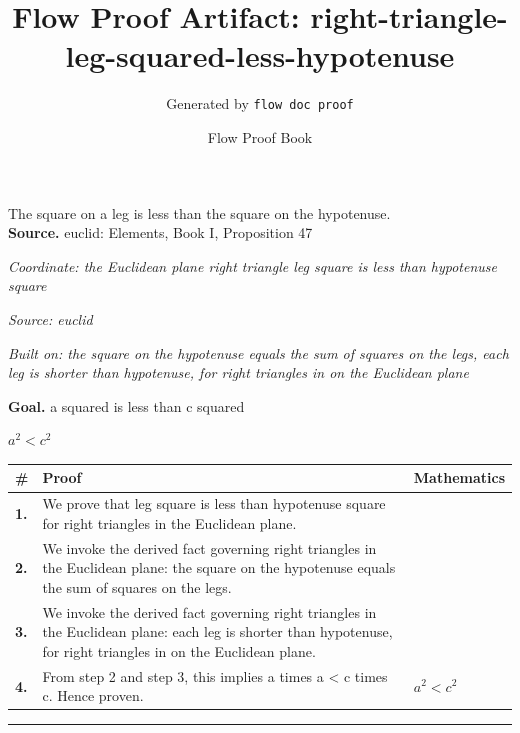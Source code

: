 \documentclass[11pt]{article}
\title{Flow Proof Artifact: right-triangle-leg-squared-less-hypotenuse}
\author{Generated by \texttt{flow doc proof}}
\date{Flow Proof Book}
\theoremstyle{definition}
\begin{document}
\maketitle
The square on a leg is less than the square on the hypotenuse.\\[0.5em]
\textbf{Source.} euclid: Elements, Book I, Proposition 47\\[0.5em]
\bigskip
{}\par
\smallskip\noindent\textit{Coordinate: the Euclidean plane \cdot right triangle \cdot leg square is less than hypotenuse square}\par
\smallskip\noindent\textit{Source: euclid}\par
\smallskip\noindent\textit{Built on: the square on the hypotenuse equals the sum of squares on the legs, each leg is shorter than hypotenuse, for right triangles in on the Euclidean plane}\par
\medskip
\noindent\textbf{Goal.} a squared is less than c squared\par
\noindent$\displaystyle a^{2} < c^{2}$\par
\medskip
\noindent
\begin{tabular}{@{} >{\raggedright\arraybackslash}p{} >{\raggedright\arraybackslash}p{} >{\raggedleft\arraybackslash}p{} @{}}
\textbf{\#} & \textbf{Proof} & \textbf{Mathematics} \\
\midrule
\textbf{1.} & We prove that leg square is less than hypotenuse square for right triangles in the Euclidean plane. & \\[0.45em]
\textbf{2.} & We invoke the derived fact governing right triangles in the Euclidean plane: the square on the hypotenuse equals the sum of squares on the legs. & \\[0.45em]
\textbf{3.} & We invoke the derived fact governing right triangles in the Euclidean plane: each leg is shorter than hypotenuse, for right triangles in on the Euclidean plane. & \\[0.45em]
\textbf{4.} & From step 2 and step 3, this implies a times a < c times c. Hence proven. & $\displaystyle a^{2} < c^{2}$ \\[0.45em]
\bottomrule
\end{tabular}
\label{thm:Geometry-right triangle-leg_square_is_less_than_hypotenuse_square}
\par\medskip\hrule
\end{document}
